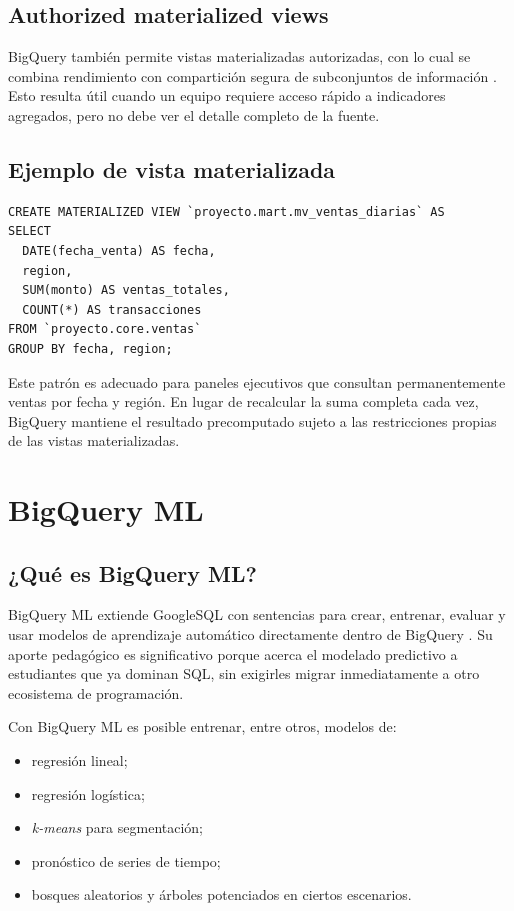 \documentclass[12pt]{article}
\begin{document}
\subsection{Authorized materialized views}
BigQuery también permite vistas materializadas autorizadas, con lo cual se combina rendimiento con compartición segura de subconjuntos de información \cite{gcp_materialized_views_intro,gcp_authorized_views}. Esto resulta útil cuando un equipo requiere acceso rápido a indicadores agregados, pero no debe ver el detalle completo de la fuente.

\subsection{Ejemplo de vista materializada}
\begin{lstlisting}[style=sql, caption={Vista materializada para ventas diarias}]
CREATE MATERIALIZED VIEW `proyecto.mart.mv_ventas_diarias` AS
SELECT
  DATE(fecha_venta) AS fecha,
  region,
  SUM(monto) AS ventas_totales,
  COUNT(*) AS transacciones
FROM `proyecto.core.ventas`
GROUP BY fecha, region;
\end{lstlisting}

Este patrón es adecuado para paneles ejecutivos que consultan permanentemente ventas por fecha y región. En lugar de recalcular la suma completa cada vez, BigQuery mantiene el resultado precomputado sujeto a las restricciones propias de las vistas materializadas.

\section{BigQuery ML}
\subsection{¿Qué es BigQuery ML?}
BigQuery ML extiende GoogleSQL con sentencias para crear, entrenar, evaluar y usar modelos de aprendizaje automático directamente dentro de BigQuery \cite{gcp_bqml_intro,gcp_bqml_create_model}. Su aporte pedagógico es significativo porque acerca el modelado predictivo a estudiantes que ya dominan SQL, sin exigirles migrar inmediatamente a otro ecosistema de programación.

Con BigQuery ML es posible entrenar, entre otros, modelos de:

\begin{itemize}[leftmargin=*]
\item regresión lineal;
\item regresión logística;
\item \textit{k-means} para segmentación;
\item pronóstico de series de tiempo;
\item bosques aleatorios y árboles potenciados en ciertos escenarios.
\end{itemize}
\end{document}
